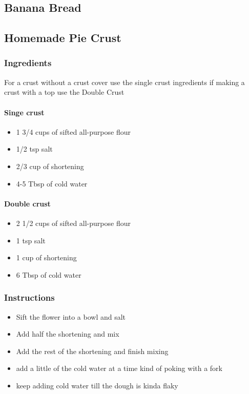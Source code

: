 \documentclass[11pt]{article}
\begin{document}
\subsection{Banana Bread}
\label{sec:org9a01fc3}
\subsection{Homemade Pie Crust}
\label{sec:org06e0c46}
\subsubsection*{Ingredients}
\label{sec:org95787f6}
For a crust without a crust cover use the single crust ingredients if making a crust with a top use the Double Crust
\paragraph*{Singe crust}
\label{sec:org193f236}
\begin{itemize}
\item 1 3/4 cups of sifted all-purpose flour
\item 1/2 tsp salt
\item 2/3 cup of shortening
\item 4-5 Tbsp of cold water
\end{itemize}
\paragraph*{Double crust}
\label{sec:org65a5839}
\begin{itemize}
\item 2 1/2 cups of sifted all-purpose flour
\item 1 tsp salt
\item 1 cup of shortening
\item 6 Tbsp of cold water
\end{itemize}
\subsubsection*{Instructions}
\label{sec:org879630e}
\begin{itemize}
\item Sift the flower into a bowl and salt
\item Add half the shortening and mix
\item Add the rest of the shortening and finish mixing
\item add a little of the cold water at a time kind of poking with a fork
\item keep adding cold water till the dough is kinda flaky
\end{itemize}
\end{document}

